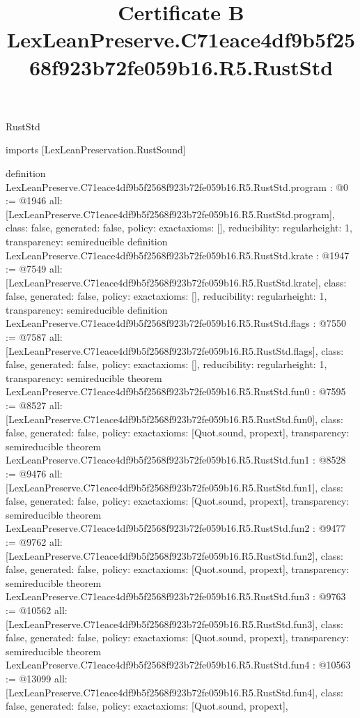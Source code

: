 \begin{lexlean}{RustStd}
\title{Certificate B LexLeanPreserve.C71eace4df9b5f2568f923b72fe059b16.R5.RustStd}
\begin{coremodule}
imports [LexLeanPreservation.RustSound]

definition LexLeanPreserve.C71eace4df9b5f2568f923b72fe059b16.R5.RustStd.program : @0 := @1946 {
  all: [LexLeanPreserve.C71eace4df9b5f2568f923b72fe059b16.R5.RustStd.program],
  class: false,
  generated: false,
  policy: exact{axioms: []},
  reducibility: regular{height: 1},
  transparency: semireducible
}
definition LexLeanPreserve.C71eace4df9b5f2568f923b72fe059b16.R5.RustStd.krate : @1947 := @7549 {
  all: [LexLeanPreserve.C71eace4df9b5f2568f923b72fe059b16.R5.RustStd.krate],
  class: false,
  generated: false,
  policy: exact{axioms: []},
  reducibility: regular{height: 1},
  transparency: semireducible
}
definition LexLeanPreserve.C71eace4df9b5f2568f923b72fe059b16.R5.RustStd.flags : @7550 := @7587 {
  all: [LexLeanPreserve.C71eace4df9b5f2568f923b72fe059b16.R5.RustStd.flags],
  class: false,
  generated: false,
  policy: exact{axioms: []},
  reducibility: regular{height: 1},
  transparency: semireducible
}
theorem LexLeanPreserve.C71eace4df9b5f2568f923b72fe059b16.R5.RustStd.fun0 : @7595 := @8527 {
  all: [LexLeanPreserve.C71eace4df9b5f2568f923b72fe059b16.R5.RustStd.fun0],
  class: false,
  generated: false,
  policy: exact{axioms: [Quot.sound, propext]},
  transparency: semireducible
}
theorem LexLeanPreserve.C71eace4df9b5f2568f923b72fe059b16.R5.RustStd.fun1 : @8528 := @9476 {
  all: [LexLeanPreserve.C71eace4df9b5f2568f923b72fe059b16.R5.RustStd.fun1],
  class: false,
  generated: false,
  policy: exact{axioms: [Quot.sound, propext]},
  transparency: semireducible
}
theorem LexLeanPreserve.C71eace4df9b5f2568f923b72fe059b16.R5.RustStd.fun2 : @9477 := @9762 {
  all: [LexLeanPreserve.C71eace4df9b5f2568f923b72fe059b16.R5.RustStd.fun2],
  class: false,
  generated: false,
  policy: exact{axioms: [Quot.sound, propext]},
  transparency: semireducible
}
theorem LexLeanPreserve.C71eace4df9b5f2568f923b72fe059b16.R5.RustStd.fun3 : @9763 := @10562 {
  all: [LexLeanPreserve.C71eace4df9b5f2568f923b72fe059b16.R5.RustStd.fun3],
  class: false,
  generated: false,
  policy: exact{axioms: [Quot.sound, propext]},
  transparency: semireducible
}
theorem LexLeanPreserve.C71eace4df9b5f2568f923b72fe059b16.R5.RustStd.fun4 : @10563 := @13099 {
  all: [LexLeanPreserve.C71eace4df9b5f2568f923b72fe059b16.R5.RustStd.fun4],
  class: false,
  generated: false,
  policy: exact{axioms: [Quot.sound, propext]},
}
\end{coremodule}
\end{lexlean}
